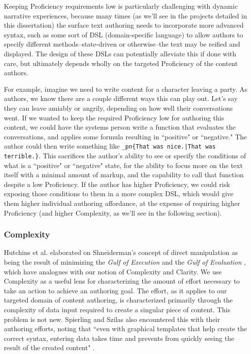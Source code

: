 Keeping Proficiency requirements low is particularly challenging with dynamic narrative experiences, because many times (as we'll see in the projects detailed in this dissertation) the surface text authoring needs to incorporate more advanced syntax, such as some sort of DSL (domain-specific language) to allow authors to specify different methods--state-driven or otherwise--the text may be reified and displayed. The design of these DSLs can potentially alleviate this if done with care, but ultimately depends wholly on the targeted Proficiency of the content authors. 

For example, imagine we need to write content for a character leaving a party. As authors, we know there are a couple different ways this can play out. Let's say they can leave amiably or angrily, depending on how well their conversations went. If we wanted to keep the required Proficiency low for authoring this content, we could have the systems person write a function that evaluates the conversations, and applies some formula resulting in ``positive" or ``negative." The author could then write something like \verb!_pn{That was nice.|That was terrible.}!. This sacrifices the author's ability to see or specify the conditions of what is a ``positive" or ``negative" state, for the ability to focus more on the text itself with a minimal amount of markup, and the capability to call that function despite a low Proficiency. If the author has higher Proficiency, we could risk exposing those conditions to them in a more complex DSL, which would give them higher individual authoring affordance, at the expense of requiring higher Proficiency (and higher Complexity, as we'll see in the following section).

\subsubsection{Complexity}

Hutchins et al. elaborated on Shneiderman's concept of direct manipulation as being the result of minimizing the \textit{Gulf of Execution} and the \textit{Gulf of Evaluation} \cite{Hutchins}, which have analogues with our notion of Complexity and Clarity. We use Complexity as a useful lens for characterizing the amount of effort necessary to take an action to achieve an authoring goal. The effort, as it applies to our targeted domain of content authoring, is characterized primarily through the complexity of data input required to create a singular piece of content. This problem is not new. Spierling and Szilas also encountered this with their authoring efforts, noting that ``even with graphical templates that help create the correct syntax, entering data takes time and prevents from quickly seeing the result of the created content" \cite{authoring_issues}.

